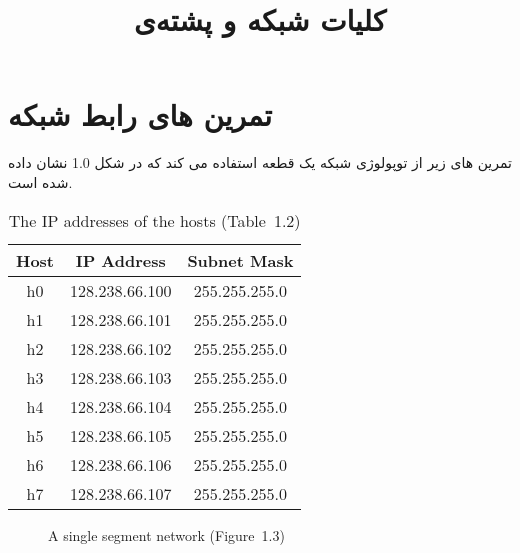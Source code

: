 \documentclass{../UTNetLabFa}
\title{کلیات شبکه و پشته‌ی \textLR{TCP-IP}}
\begin{document}
\pagebreak

\part{تمرین های رابط شبکه}
تمرین های زیر از توپولوژی شبکه یک قطعه استفاده می کند که در شکل 1.0 نشان داده شده است.
	{
		\begin{center}
			\begin{minipage}{0.48\textwidth}
				\begin{flushleft}
					\begin{table}[H]
						\caption{The IP addresses of the hosts (Table~1.2)}
						\centering
						\begin{tabular}{ c c c }
							\hline \hline
							Host & IP Address & Subnet Mask \\
							\hline 
							h0 & 128.238.66.100 & 255.255.255.0 \\
							h1 & 128.238.66.101 & 255.255.255.0 \\
							h2 & 128.238.66.102 & 255.255.255.0 \\
							h3 & 128.238.66.103 & 255.255.255.0 \\
							h4 & 128.238.66.104 & 255.255.255.0 \\
							h5 & 128.238.66.105 & 255.255.255.0 \\
							h6 & 128.238.66.106 & 255.255.255.0 \\
							h7 & 128.238.66.107 & 255.255.255.0 \\
							\hline \hline
							\end{tabular}
					\end{table}
				\end{flushleft}
			\end{minipage}
			\begin{minipage}{0.48\textwidth}
				\begin{flushright}
					\begin{figure}[H]
						\centering
						\caption{A single segment network (Figure~1.3)}\label{fig:1.3}
					\end{figure}
				\end{flushright}
			\end{minipage}
		\end{center}
	}
\end{document}
